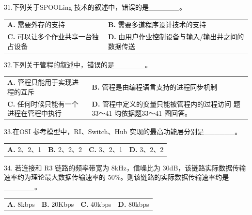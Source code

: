 \documentclass[UTF8,11pt]{ctexart}
\begin{document}
31.下列关于SPOOLing 技术的叙述中，错误的是\_\_\_\_\_\_。


\begin{center}\begin{tabular}{>{\raggedright\arraybackslash}p{\dimexpr(\linewidth-4\tabcolsep)/2\relax}>{\raggedright\arraybackslash}p{\dimexpr(\linewidth-4\tabcolsep)/2\relax}}
\textbf{A.} 需要外存的支持 & \textbf{B.} 需要多道程序设计技术的支持\\[.35em]
\textbf{C.} 可以让多个作业共享一台独占设备 & \textbf{D.} 由用户作业控制设备与输入/输出井之间的数据传送\\[.35em]\end{tabular}\end{center}

32.下列关于管程的叙述中，错误的是\_\_\_\_\_\_。


\begin{center}\begin{tabular}{>{\raggedright\arraybackslash}p{\dimexpr(\linewidth-4\tabcolsep)/2\relax}>{\raggedright\arraybackslash}p{\dimexpr(\linewidth-4\tabcolsep)/2\relax}}
\textbf{A.} 管程只能用于实现进程的互斥 & \textbf{B.} 管程是由编程语言支持的进程同步机制\\[.35em]
\textbf{C.} 任何时候只能有一个进程在管程中执行 & \textbf{D.} 管程中定义的变量只能被管程内的过程访问 题33～41 均依据题33～41 图回答。\\[.35em]\end{tabular}\end{center}

33.在OSI 参考模型中，RI、Switch、Hub 实现的最高功能层分别是\_\_\_\_\_\_。


\begin{center}\begin{tabular}{>{\raggedright\arraybackslash}p{\dimexpr(\linewidth-8\tabcolsep)/4\relax}>{\raggedright\arraybackslash}p{\dimexpr(\linewidth-8\tabcolsep)/4\relax}>{\raggedright\arraybackslash}p{\dimexpr(\linewidth-8\tabcolsep)/4\relax}>{\raggedright\arraybackslash}p{\dimexpr(\linewidth-8\tabcolsep)/4\relax}}
\textbf{A.} 2、2、1 & \textbf{B.} 2、2、2 & \textbf{C.} 3、2、1 & \textbf{D.} 3、2、2\\[.35em]\end{tabular}\end{center}

34. 若连接和 R3 链路的频率带宽为 8kHz，信噪比为 30dB，该链路实际数据传输速率约为理论最大数据传输速率的 50\%。则该链路的实际数据传输速率约是\_\_\_\_\_\_。


\begin{center}\begin{tabular}{>{\raggedright\arraybackslash}p{\dimexpr(\linewidth-8\tabcolsep)/4\relax}>{\raggedright\arraybackslash}p{\dimexpr(\linewidth-8\tabcolsep)/4\relax}>{\raggedright\arraybackslash}p{\dimexpr(\linewidth-8\tabcolsep)/4\relax}>{\raggedright\arraybackslash}p{\dimexpr(\linewidth-8\tabcolsep)/4\relax}}
\textbf{A.} 8kbps & \textbf{B.} 20Kbps & \textbf{C.} 40kbps & \textbf{D.} 80kbps\\[.35em]\end{tabular}\end{center}
\end{document}
